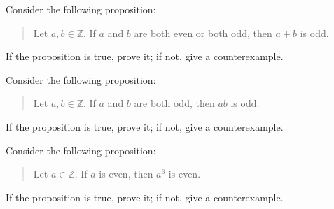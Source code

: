 \documentclass[12pt]{midterm}
\begin{document}
\begin{exam}
\begin{solution}\begin{solutiontext}
\end{solutiontext}\end{solution}

\begin{problem}[360]
  Consider the following proposition:
  \begin{quote}
    Let $a,b \in \mathbb{Z}$.  If $a$ and $b$ are both even or both odd, then $a + b$ is odd.
  \end{quote}
  If the proposition is true, prove it; if not, give a counterexample.
\end{problem}

\begin{solution}\begin{solutiontext}
\end{solutiontext}\end{solution}

\begin{problem}[360]
  Consider the following proposition:
  \begin{quote}
    Let $a,b \in \mathbb{Z}$.  If $a$ and $b$ are both odd, then $ab$ is odd.
  \end{quote}
  If the proposition is true, prove it; if not, give a counterexample.
\end{problem}

\begin{solution}\begin{solutiontext}
\end{solutiontext}\end{solution}

\begin{problem}[360]
  Consider the following proposition:
  \begin{quote}
    Let $a \in \mathbb{Z}$.  If $a$ is even, then $a^{6}$ is even.
  \end{quote}
  If the proposition is true, prove it; if not, give a counterexample.
\end{problem}

\begin{solution}\begin{solutiontext}
\end{solutiontext}\end{solution}


\end{exam}
\end{document}
